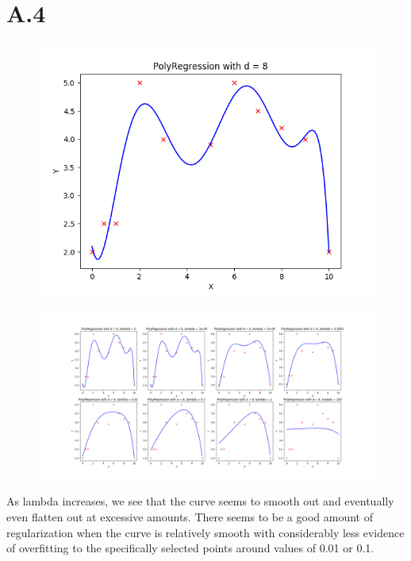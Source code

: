 \documentclass{article}
\newcommand{\1}{\mathbf{1}}
\begin{document}
\section*{A.4}
{\Large 

\begin{figure}[hb]
  \centering
  \includegraphics[width=150mm]{../hw1-code/results/a4.png}
\end{figure}

\begin{figure}[!ht]
\centering
\includegraphics[width=218mm]{../hw1-code/results/a4_compilation.png}
\end{figure}

As lambda increases, we see that the curve seems to smooth out and eventually even flatten out at excessive amounts. There seems to be a good amount of regularization when the curve is relatively smooth with considerably less evidence of overfitting to the specifically selected points around values of 0.01 or 0.1.

}
\end{document}
